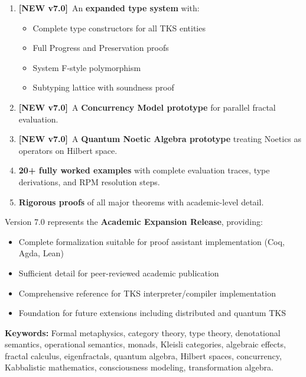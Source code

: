 \documentclass[11pt,twoside,openright]{book}
\theoremstyle{definition}
\theoremstyle{plain}
\theoremstyle{remark}
\newcommand{\vnew}{\textcolor{blue!70!black}{\textbf{[NEW v7.0]}}}
\begin{document}
\begin{enumerate}[label=(\arabic*)]
  \item \vnew\ An \textbf{expanded type system} with:
    \begin{itemize}
      \item Complete type constructors for all TKS entities
      \item Full Progress and Preservation proofs
      \item System F-style polymorphism
      \item Subtyping lattice with soundness proof
    \end{itemize}

  \item \vnew\ A \textbf{Concurrency Model prototype} for parallel fractal evaluation.

  \item \vnew\ A \textbf{Quantum Noetic Algebra prototype} treating Noetics as operators on Hilbert space.

  \item \textbf{20+ fully worked examples} with complete evaluation traces, type derivations, and RPM resolution steps.

  \item \textbf{Rigorous proofs} of all major theorems with academic-level detail.
\end{enumerate}

Version 7.0 represents the \textbf{Academic Expansion Release}, providing:
\begin{itemize}
  \item Complete formalization suitable for proof assistant implementation (Coq, Agda, Lean)
  \item Sufficient detail for peer-reviewed academic publication
  \item Comprehensive reference for TKS interpreter/compiler implementation
  \item Foundation for future extensions including distributed and quantum TKS
\end{itemize}

\vspace{1em}
\noindent\textbf{Keywords:} Formal metaphysics, category theory, type theory, denotational semantics, operational semantics, monads, Kleisli categories, algebraic effects, fractal calculus, eigenfractals, quantum algebra, Hilbert spaces, concurrency, Kabbalistic mathematics, consciousness modeling, transformation algebra.

\tableofcontents
\end{document}
